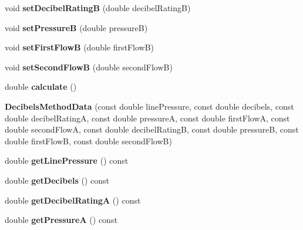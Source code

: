 \begin{DoxyCompactItemize}
void {\bfseries set\+Decibel\+RatingB} (double decibel\+RatingB)
\item 
\mbox{\label{class_decibels_method_data_a553e41bdd398e74031b899178348afd3}} 
void {\bfseries set\+PressureB} (double pressureB)
\item 
\mbox{\label{class_decibels_method_data_a00d9e5948d8ec010fc141b4939c565a2}} 
void {\bfseries set\+First\+FlowB} (double first\+FlowB)
\item 
\mbox{\label{class_decibels_method_data_a061d9c83fcdc4b9f50d9ba0fb21777f7}} 
void {\bfseries set\+Second\+FlowB} (double second\+FlowB)
\item 
\mbox{\label{class_decibels_method_data_af76c41c665ccd27190eda48f3874ade1}} 
double {\bfseries calculate} ()
\item 
\mbox{\label{class_decibels_method_data_a7c482e723ee17a137b7f120e1b942e3e}} 
{\bfseries Decibels\+Method\+Data} (const double line\+Pressure, const double decibels, const double decibel\+RatingA, const double pressureA, const double first\+FlowA, const double second\+FlowA, const double decibel\+RatingB, const double pressureB, const double first\+FlowB, const double second\+FlowB)
\item 
\mbox{\label{class_decibels_method_data_a329863849958d0604ff628cbc12160b9}} 
double {\bfseries get\+Line\+Pressure} () const
\item 
\mbox{\label{class_decibels_method_data_a58fdf6f9852ac552623fddc31f1bf2f7}} 
double {\bfseries get\+Decibels} () const
\item 
\mbox{\label{class_decibels_method_data_a9eef52f267377c5ab399babff216c3e6}} 
double {\bfseries get\+Decibel\+RatingA} () const
\item 
\mbox{\label{class_decibels_method_data_a46a911b5541c6bf466177ca65f1e6abc}} 
double {\bfseries get\+PressureA} () const
\item 
\mbox{\label{class_decibels_method_data_a3967d6bdcbc252db6ec936ce17d51eca}} 

\end{DoxyCompactItemize}
